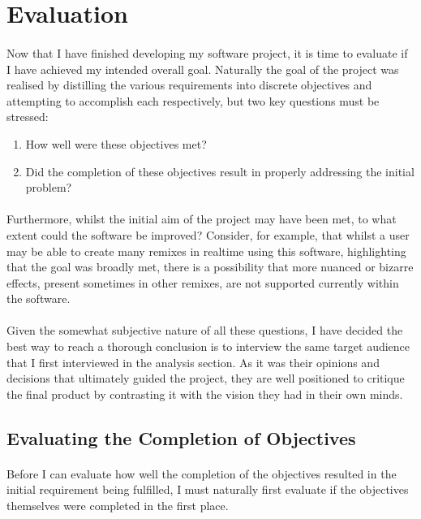 \section{Evaluation}
\paragraph{}
Now that I have finished developing my software project, it is time to evaluate if I have achieved my intended overall goal. Naturally the goal of the project was realised by distilling the various requirements into discrete objectives and attempting to accomplish each respectively, but two key questions must be stressed:
\begin{enumerate}
	\item How well were these objectives met?
	\item Did the completion of these objectives result in properly addressing the initial problem?
\end{enumerate}

\paragraph{}
Furthermore, whilst the initial aim of the project may have been met, to what extent could the software be improved? Consider, for example, that whilst a user may be able to create many remixes in realtime using this software, highlighting that the goal was broadly met, there is a possibility that more nuanced or bizarre effects, present sometimes in other remixes, are not supported currently within the software.

\paragraph{}
Given the somewhat subjective nature of all these questions, I have decided the best way to reach a thorough conclusion is to interview the same target audience that I first interviewed in the analysis section. As it was their opinions and decisions that ultimately guided the project, they are well positioned to critique the final product by contrasting it with the vision they had in their own minds.

\pagebreak
\subsection{Evaluating the Completion of Objectives}
\paragraph{}
Before I can evaluate how well the completion of the objectives resulted in the initial requirement being fulfilled,  I must naturally first evaluate if the objectives themselves were completed in the first place.

